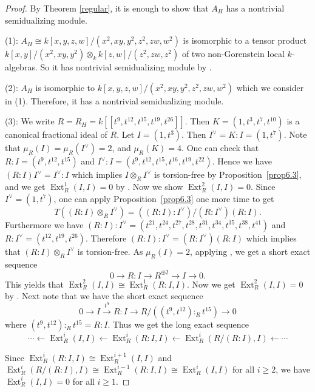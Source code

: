 \documentclass{amsart}
\DeclareMathOperator{\Ext}{Ext}
\theoremstyle{plain}
\theoremstyle{definition}
\numberwithin{theorem}{section}
\numberwithin{equation}{section}
\numberwithin{equation}{theorem}
\begin{document}
\begin{proof}

By Theorem \ref{regular}, it is enough to show that $A_H$ has a nontrivial semidualizing module.

(1): $A_H \cong k[x,y,z,w]/(x^2,xy,y^2,z^2,zw,w^2)$ is isomorphic to a tensor product $k[x,y]/(x^2,xy,y^2) \otimes_k k[z,w]/(z^2,zw,z^2)$ of two non-Gorenstein local $k$-algebras.
So it has nontrivial semidualizing module by \cite[Corollary 4.9]{A}.

(2): $A_H$ is isomorphic to $k[x,y,z,w]/(x^2,xy,y^2,z^2,zw,w^2)$ which we consider in (1).
Therefore, it has a nontrivial semidualizing module.

(3): We write $R=R_H=k[\![t^9,t^{12},t^{15},t^{19},t^{26}]\!]$.
Then $K=(1, t^3, t^7, t^{10})$ is a canonical fractional ideal of $R$.
Let $I=(1,t^3)$.
Then $I^{\vee}=K: I=(1, t^7)$.
Note that $\mu_R(I)=\mu_R(I^{\vee})=2$, and $\mu_R(K)=4$.
One can check that $R:I=(t^9, t^{12}, t^{15})$ and $I^{\vee}:I=(t^9, t^{12}, t^{15}, t^{16}, t^{19}, t^{22})$. Hence we have $(R:I)I^{\vee}=I^{\vee}:I$ which implies $I\otimes_R I^{\vee}$ is torsion-free by Proposition~\ref{prop6.3}, and we get $\Ext_R^1(I, I)=0$ by \cite[Lemma 4.6]{HW}.
Now we show $\Ext^2_R(I, I)=0$.
Since $I^{\vee}=(1, t^7)$, one can apply Proposition~\ref{prop6.3} one more time to get $$T((R:I)\otimes_R I^{\vee})=((R:I):I^{\vee})/(R:I^{\vee})(R:I).$$
Furthermore we have $(R:I):I^{\vee}=(t^{21}, t^{24}, t^{27}, t^{28}, t^{31}, t^{34}, t^{35}, t^{38}, t^{41})$ and $R:I^{\vee}=(t^{12}, t^{19}, t^{26})$. Therefore $(R:I):I^{\vee}=(R:I^{\vee})(R:I)$ which implies that $(R:I)\otimes_R I^{\vee}$ is torsion-free.
As $\mu_R(I)=2$, applying \cite[Lemma 3.3]{HH}, we get a short exact sequence
\[
0 \to R:I \to R^{\oplus 2} \to I \to 0.
\]
This yields that $\Ext^2_R(I, I) \cong \Ext^1_R(R:I, I)$.
Now we get $\Ext^2_R(I, I)=0$ by \cite[Lemma 4.6]{HW}. Next note that we have the short exact sequence 
\begin{equation}
0\xrightarrow{} I \xrightarrow{t^9} R:I \xrightarrow{} R/ ((t^9, t^{12}):_R t^{15}) \xrightarrow{} 0 
\end{equation}
where $(t^9, t^{12}):_R t^{15}=R:I$.
Thus we get the long exact sequence 
\begin{equation}\cdots \xleftarrow{} \Ext_R^i(I, I)\xleftarrow{} \Ext_R^i(R:I, I) \xleftarrow{} \Ext^i_R(R/(R:I), I) \xleftarrow{} \cdots 
\end{equation}

Since $\Ext_R^i(R:I, I) \cong \Ext_R^{i+1} (I,I)$ and $\Ext^i_R(R/(R:I), I) \cong \Ext^{i-1}_R(R:I, I) \cong \Ext^i_R(I, I)$ for all $i\geq 2$, we have $\Ext^i_R(I, I) = 0$ for all $i \ge 1$. 


\end{proof}
\end{document}
